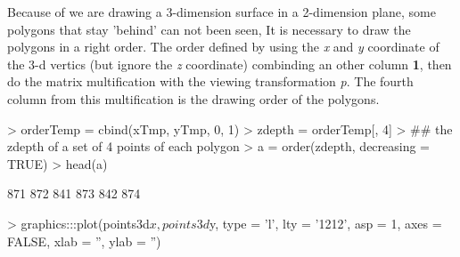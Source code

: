 \documentclass[a4paper,10pt]{article}
\begin{document}
Because of we are drawing a 3-dimension surface in a 2-dimension plane, some polygons that stay 'behind' can not been seen, It is necessary to draw the polygons in a right order. The order defined by using the \emph{x} and \emph{y} coordinate of the 3-d vertics (but ignore the \emph{z} coordinate) combinding an other column \textbf{1}, then do the matrix multification with the viewing transformation \emph{p}. The fourth column from this multification is the drawing order of the polygons.
\begin{Schunk}
\begin{Sinput}
> orderTemp = cbind(xTmp, yTmp, 0, 1) %
> zdepth = orderTemp[, 4]
> ## the zdepth of a set of 4 points of each polygon
> a = order(zdepth, decreasing = TRUE)
> head(a)
\end{Sinput}
\begin{Soutput}
[1] 871 872 841 873 842 874
\end{Soutput}
\end{Schunk}

\begin{Schunk}
\begin{Sinput}
> graphics:::plot(points3d$x, points3d$y, type = 'l', lty = '1212', asp = 1, axes = FALSE, xlab = '', ylab = '')
\end{Sinput}
\end{Schunk}
\end{document}
